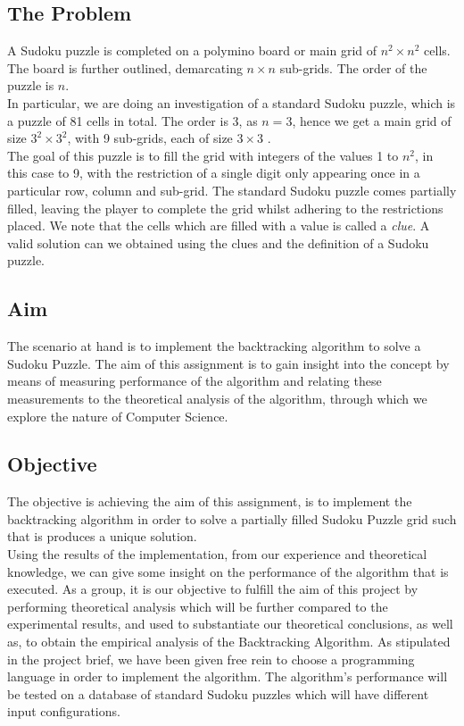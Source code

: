 \documentclass[12pt]{article}
\begin{document}
\subsection{The Problem}
A Sudoku puzzle is completed on a polymino board or main grid of $ n^2 \times n^2$ cells. The board is further outlined, demarcating $n \times n $ sub-grids. The order of the puzzle is $n$. \\
In particular, we are doing an investigation of a standard Sudoku puzzle, which is a puzzle of 81 cells in total. The order is 3, as $n = 3$, hence we get a main grid of size $3^2\times 3^2$, with 9 sub-grids, each of size $ 3\times 3 $ .\\
The goal of this puzzle is to fill the grid with integers of the values 1 to $n^2$, in this case to 9, with the restriction of a single digit only appearing once in a particular row, column and sub-grid. The standard Sudoku puzzle comes partially filled, leaving the player to complete the grid whilst adhering to the restrictions placed. We note that the cells which are  filled with a value is called a \textsl{clue}. A valid solution can we obtained using the clues and the definition of a Sudoku puzzle.  
  
\subsection{Aim}
\begin{flushleft}
The scenario at hand is to implement the backtracking algorithm to solve a Sudoku Puzzle. The aim of this assignment is to gain insight into the concept by means of measuring performance of the algorithm and relating these  measurements to the theoretical analysis of the algorithm, through which we explore the nature of Computer Science. 
\end{flushleft}
\subsection{Objective}
\begin{flushleft}
The objective is achieving the aim of this assignment, is to implement the backtracking algorithm in order to solve a partially filled Sudoku Puzzle grid such that is produces a unique solution. \\
Using the results of the implementation, from our experience and theoretical knowledge, we can give some insight on the performance of the algorithm that is executed. As a group, it is our objective to fulfill the aim of this project by performing theoretical analysis which will be further compared to the experimental results, and used to substantiate our theoretical conclusions, as well as, to obtain the empirical analysis of the Backtracking Algorithm. As stipulated in the project brief, we have been given free rein to choose a programming language in order to implement the algorithm. The algorithm's performance will be tested on a database of standard Sudoku puzzles which will have different input configurations. 
\end{flushleft}	
\end{document}
